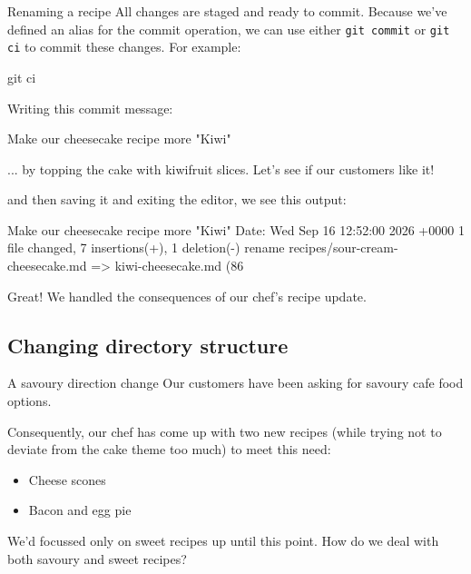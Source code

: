 \documentclass{git_course}
\begin{document}
\begin{frame}[fragile]{Renaming a recipe}
    All changes are staged and ready to commit.  Because we've defined an
    alias for the commit operation, we can use either
    \texttt{git commit} or \texttt{git ci} to commit
    these changes.  For example:

    \begin{shellcode}
        git ci
    \end{shellcode}

    Writing this commit message:
    \begin{outputcode}
    Make our cheesecake recipe more "Kiwi"

    ... by topping the cake with kiwifruit slices.  Let's see if our
    customers like it!
    \end{outputcode}

    and then saving it and exiting the editor, we see this output:

    \begin{outputcode}
[main e7b93eb] Make our cheesecake recipe more "Kiwi"
 Date: Wed Sep 16 12:52:00 2026 +0000
 1 file changed, 7 insertions(+), 1 deletion(-)
 rename recipes/{sour-cream-cheesecake.md => kiwi-cheesecake.md} (86%
    \end{outputcode}

    Great!  We handled the consequences of our chef's recipe update.
\end{frame}

\subsection{Changing directory structure}

\begin{frame}[fragile]{A savoury direction change}
    Our customers have been asking for savoury cafe food options.

    Consequently, our chef has come up with two new recipes (while trying
    not to deviate from the cake theme too much) to meet this need:
    \begin{itemize}
        \item Cheese scones
        \item Bacon and egg pie
    \end{itemize}

    We'd focussed only on sweet recipes up until this point.  How do we deal
    with both savoury and sweet recipes?
\end{frame}
\end{document}
